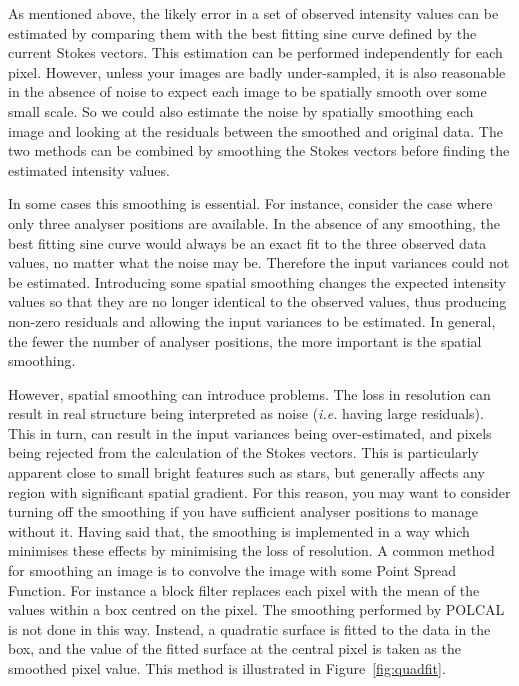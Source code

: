 \documentclass[twoside,11pt]{article}
\newcommand{\latex}[1]{#1}
\newcommand{\html}[1]{}
\renewcommand{\_}{\texttt{\symbol{95}}}
\begin{document}
\begin{enumerate}
As mentioned above, the likely error in a set of observed intensity
values can be estimated by comparing them with the best fitting sine
curve defined by the current Stokes vectors. This estimation can be
performed independently for each pixel. However, unless your images are
badly under-sampled, it is also reasonable in the absence of noise to
expect each image to be spatially smooth over some small scale. So we
could also estimate the noise by spatially smoothing each image and
looking at the residuals between the smoothed and original data. The two
methods can be combined by smoothing the Stokes vectors before finding the
estimated intensity values.

In some cases this smoothing is essential. For instance, consider the
case where only three analyser positions are available. In the absence of 
any smoothing, the best fitting sine curve would always be an exact fit 
to the three observed data values, no matter what the noise may be. Therefore 
the input variances could not be estimated. Introducing some spatial
smoothing changes the expected intensity values so that they are no
longer identical to the observed values, thus producing non-zero
residuals and allowing the input variances to be estimated. In general,
the fewer the number of analyser positions, the more important is the 
spatial smoothing.

However, spatial smoothing can introduce problems. The loss in resolution
can result in real structure being interpreted as noise (\emph{i.e.}
having large residuals). This in turn, can result in the input variances
being over-estimated, and pixels being rejected from the calculation of
the Stokes vectors. This is particularly apparent close to small bright
features such as stars, but generally affects any region with significant
spatial gradient. For this reason, you may want to consider turning off
the smoothing if you have sufficient analyser positions to manage without
it. Having said that, the smoothing is implemented in a way which
minimises these effects by minimising the loss of resolution. A common
method for smoothing an image is to convolve the image with some Point
Spread Function. For instance a block filter replaces each pixel with the
mean of the values within a box centred on the pixel. The smoothing
performed by POLCAL is not done in this way. Instead, a quadratic surface
is fitted to the data in the box, and the value of the fitted surface at
the central pixel is taken as the smoothed pixel value. This method is
illustrated in \latex{Figure~\ref{fig:quadfit}.} \html{the next figure:}


\end{enumerate}
\end{document}
